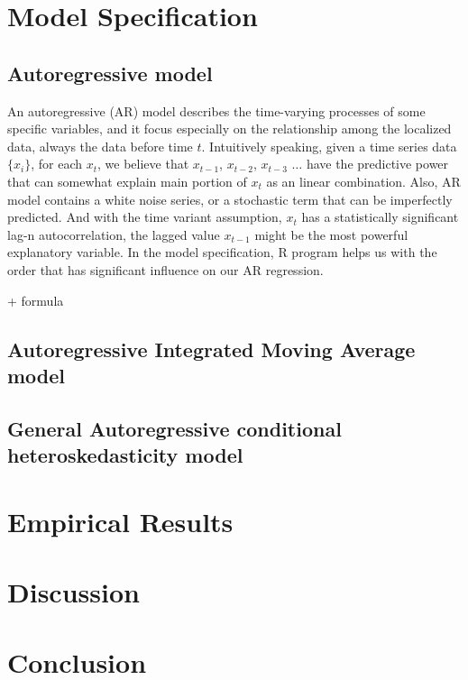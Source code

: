 \documentclass[12pt,letterpaper]{article}
\begin{document}
\section{Model Specification}
\subsection{Autoregressive model}
An autoregressive (AR) model describes the time-varying processes of some specific variables, and it focus especially on the relationship among the localized data, always the data before time $t$. 
Intuitively speaking, given a time series data $ \{x_i\}$, for each $x_t$, we believe that $x_{t-1}$, $x_{t-2}$, $x_{t-3}$ $\dots$ have the predictive power that can somewhat explain main portion of $x_t$ as an linear combination.
Also, AR model contains a white noise series, or a stochastic term that can be imperfectly predicted.
And with the time variant assumption, $x_t$ has a statistically significant lag-n autocorrelation, the lagged value $x_{t-1}$ might be the most powerful explanatory variable.
In the model specification, R program helps us with the order that has significant influence on our AR regression.

+ formula 

\subsection{Autoregressive Integrated Moving Average model}
\subsection{General Autoregressive conditional heteroskedasticity model}



\section{Empirical Results}

\section{Discussion}

\section{Conclusion}
\end{document}
